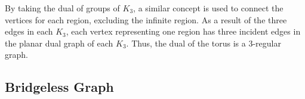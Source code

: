 \documentclass[12pt]{article}
\begin{document}
\begin{flushleft}
\medskip
By taking the dual of groups of $K_3$, a similar concept is used to connect the vertices for each region, excluding the infinite region. As a result of the three edges in each $K_3$, each vertex representing one region has three incident edges in the planar dual graph of each $K_3$. Thus, the dual of the torus is a 3-regular graph.

\subsection*{Bridgeless Graph}

\end{flushleft}
\end{document}
